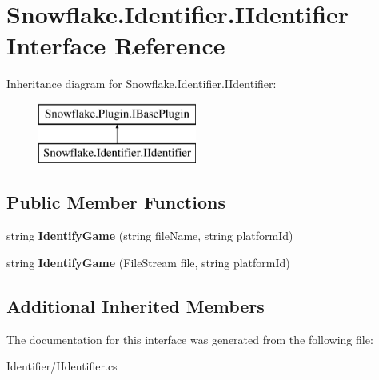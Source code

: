 \hypertarget{interface_snowflake_1_1_identifier_1_1_i_identifier}{}\section{Snowflake.\+Identifier.\+I\+Identifier Interface Reference}
\label{interface_snowflake_1_1_identifier_1_1_i_identifier}
Inheritance diagram for Snowflake.\+Identifier.\+I\+Identifier\+:\begin{figure}[H]
\begin{center}
\leavevmode
\includegraphics[height=2.000000cm]{interface_snowflake_1_1_identifier_1_1_i_identifier}
\end{center}
\end{figure}
\subsection*{Public Member Functions}
\begin{DoxyCompactItemize}
\item 
\hypertarget{interface_snowflake_1_1_identifier_1_1_i_identifier_a67579ab0b0467439f3381f9b2ce6ca6b}{}string {\bfseries Identify\+Game} (string file\+Name, string platform\+Id)\label{interface_snowflake_1_1_identifier_1_1_i_identifier_a67579ab0b0467439f3381f9b2ce6ca6b}

\item 
\hypertarget{interface_snowflake_1_1_identifier_1_1_i_identifier_ae2ebdad5be22c52be47ca198ac7aae21}{}string {\bfseries Identify\+Game} (File\+Stream file, string platform\+Id)\label{interface_snowflake_1_1_identifier_1_1_i_identifier_ae2ebdad5be22c52be47ca198ac7aae21}

\end{DoxyCompactItemize}
\subsection*{Additional Inherited Members}


The documentation for this interface was generated from the following file\+:\begin{DoxyCompactItemize}
\item 
Identifier/I\+Identifier.\+cs\end{DoxyCompactItemize}
